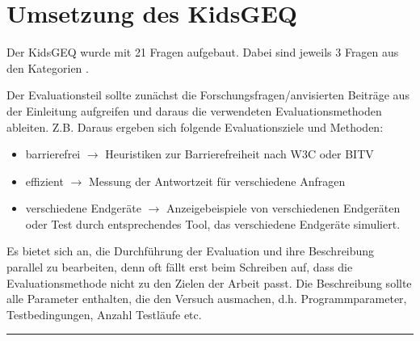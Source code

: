 \section{Umsetzung des KidsGEQ}
Der KidsGEQ wurde mit 21 Fragen aufgebaut. Dabei sind jeweils 3 Fragen aus den Kategorien .


Der Evaluationsteil sollte zunächst die Forschungsfragen/anvisierten Beiträge aus der Einleitung aufgreifen und daraus die verwendeten Evaluationsmethoden ableiten. Z.B.  Daraus ergeben sich folgende Evaluationsziele und Methoden:
\begin{itemize}
  \item barrierefrei $\rightarrow$ Heuristiken zur Barrierefreiheit nach W3C oder BITV
  \item effizient $\rightarrow$ Messung der Antwortzeit für verschiedene Anfragen
  \item verschiedene Endgeräte $\rightarrow$ Anzeigebeispiele von verschiedenen Endgeräten oder Test durch entsprechendes Tool, das verschiedene Endgeräte simuliert.
\end{itemize}

Es bietet sich an, die Durchführung der Evaluation und ihre Beschreibung parallel zu bearbeiten, denn oft fällt erst beim Schreiben auf, dass die Evaluationsmethode nicht zu den Zielen der Arbeit passt. Die Beschreibung sollte alle Parameter enthalten, die den Versuch ausmachen, d.h. Programmparameter, Testbedingungen, Anzahl Testläufe etc.


\hfil\rule{0.4\textwidth}{0.4pt}
